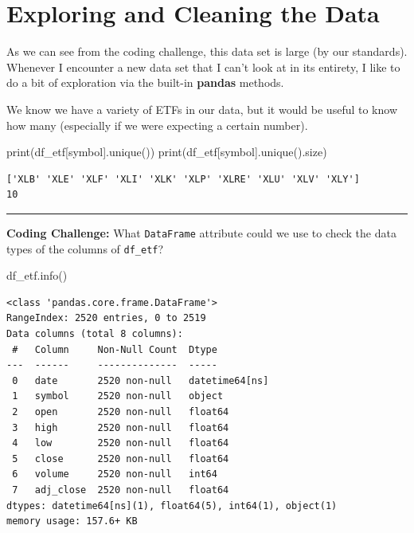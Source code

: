 \documentclass[
  letterpaper,
  DIV=11,
  numbers=noendperiod]{scrreprt}
\newenvironment{Shaded}{\begin{snugshade}}{\end{snugshade}}
\newcommand{\BuiltInTok}[1]{\textcolor[rgb]{0.00,0.23,0.31}{#1}}
\newcommand{\NormalTok}[1]{\textcolor[rgb]{0.00,0.23,0.31}{#1}}
\newcommand{\StringTok}[1]{\textcolor[rgb]{0.13,0.47,0.30}{#1}}
\begin{document}
\hypertarget{exploring-and-cleaning-the-data}{%
\section{Exploring and Cleaning the
Data}\label{exploring-and-cleaning-the-data}}

As we can see from the coding challenge, this data set is large (by our
standards). Whenever I encounter a new data set that I can't look at in
its entirety, I like to do a bit of exploration via the built-in
\textbf{pandas} methods.

We know we have a variety of ETFs in our data, but it would be useful to
know how many (especially if we were expecting a certain number).

\begin{Shaded}
\begin{Highlighting}[]
\BuiltInTok{print}\NormalTok{(df\_etf[}\StringTok{\textquotesingle{}symbol\textquotesingle{}}\NormalTok{].unique())}
\BuiltInTok{print}\NormalTok{(df\_etf[}\StringTok{\textquotesingle{}symbol\textquotesingle{}}\NormalTok{].unique().size)}
\end{Highlighting}
\end{Shaded}

\begin{verbatim}
['XLB' 'XLE' 'XLF' 'XLI' 'XLK' 'XLP' 'XLRE' 'XLU' 'XLV' 'XLY']
10
\end{verbatim}

\begin{center}\rule{0.5\linewidth}{0.5pt}\end{center}

\textbf{Coding Challenge:} What \texttt{DataFrame} attribute could we
use to check the data types of the columns of \texttt{df\_etf}?

\begin{Shaded}
\begin{Highlighting}[]
\NormalTok{df\_etf.info()}
\end{Highlighting}
\end{Shaded}

\begin{verbatim}
<class 'pandas.core.frame.DataFrame'>
RangeIndex: 2520 entries, 0 to 2519
Data columns (total 8 columns):
 #   Column     Non-Null Count  Dtype         
---  ------     --------------  -----         
 0   date       2520 non-null   datetime64[ns]
 1   symbol     2520 non-null   object        
 2   open       2520 non-null   float64       
 3   high       2520 non-null   float64       
 4   low        2520 non-null   float64       
 5   close      2520 non-null   float64       
 6   volume     2520 non-null   int64         
 7   adj_close  2520 non-null   float64       
dtypes: datetime64[ns](1), float64(5), int64(1), object(1)
memory usage: 157.6+ KB
\end{verbatim}
\end{document}
